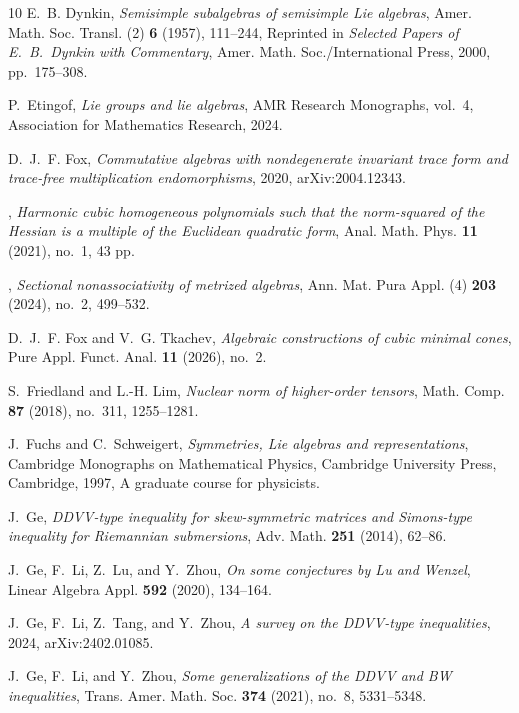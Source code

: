 \documentclass[leqno,10pt]{amsart}
\theoremstyle{definition}
\numberwithin{equation}{section}
\begin{document}
\begin{thebibliography}{10}
E.~B. Dynkin, \emph{Semisimple subalgebras of semisimple {L}ie algebras}, Amer.
  Math. Soc. Transl. (2) \textbf{6} (1957), 111--244, Reprinted in
  \emph{Selected Papers of E.~B.~Dynkin with Commentary}, Amer. Math.
  Soc./International Press, 2000, pp.~175--308.

P.~Etingof, \emph{Lie groups and lie algebras}, AMR Research Monographs,
  vol.~4, Association for Mathematics Research, 2024.

D.~J.~F. Fox, \emph{Commutative algebras with nondegenerate invariant trace
  form and trace-free multiplication endomorphisms}, 2020, arXiv:2004.12343.

\bysame, \emph{Harmonic cubic homogeneous polynomials such that the
  norm-squared of the {H}essian is a multiple of the {E}uclidean quadratic
  form}, Anal. Math. Phys. \textbf{11} (2021), no.~1, 43 pp.

\bysame, \emph{Sectional nonassociativity of metrized algebras}, Ann. Mat. Pura
  Appl. (4) \textbf{203} (2024), no.~2, 499--532.

D.~J.~F. Fox and V.~G. Tkachev, \emph{Algebraic constructions of cubic minimal
  cones}, Pure Appl. Funct. Anal. \textbf{11} (2026), no.~2.

S.~Friedland and L.-H. Lim, \emph{Nuclear norm of higher-order tensors}, Math.
  Comp. \textbf{87} (2018), no.~311, 1255--1281.

J.~Fuchs and C.~Schweigert, \emph{Symmetries, {L}ie algebras and
  representations}, Cambridge Monographs on Mathematical Physics, Cambridge
  University Press, Cambridge, 1997, A graduate course for physicists.

J.~Ge, \emph{D{DVV}-type inequality for skew-symmetric matrices and
  {S}imons-type inequality for {R}iemannian submersions}, Adv. Math.
  \textbf{251} (2014), 62--86.

J.~Ge, F.~Li, Z.~Lu, and Y.~Zhou, \emph{On some conjectures by {L}u and
  {W}enzel}, Linear Algebra Appl. \textbf{592} (2020), 134--164.

J.~Ge, F.~Li, Z.~Tang, and Y.~Zhou, \emph{A survey on the {DDVV}-type
  inequalities}, 2024, arXiv:2402.01085.

J.~Ge, F.~Li, and Y.~Zhou, \emph{Some generalizations of the {DDVV} and {BW}
  inequalities}, Trans. Amer. Math. Soc. \textbf{374} (2021), no.~8,
  5331--5348.


\end{thebibliography}
\end{document}
